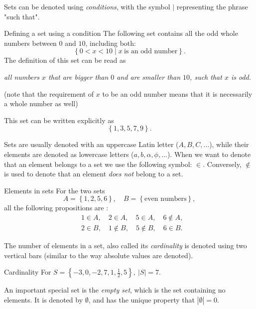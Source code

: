 Sets can be denoted using \emph{conditions}, with the symbol $|$ representing the phrase "such that".

\begin{example}{Defining a set using a condition}
	The following set contains all the odd whole numbers between $0$ and $10$, including both:
	\[
		\left\{ 0 < x < 10 \mid x\ \text{is an odd number}\right\}.
	\]
	The definition of this set can be read as

	\vspace{3mm}
	\centering
	\textit{all numbers $x$ that are bigger than $0$ and are smaller than $10$, such that $x$ is odd.}

	\flushleft{}
	(note that the requirement of $x$ to be an odd number means that it is necessarily a whole number as well)

	\vspace{1em}
	This set can be written explicitly as
	\[
		\left\{ 1,3,5,7,9 \right\}.
	\]
\end{example}

Sets are usually denoted with an uppercase Latin letter ($A,B,C,\dots$), while their elements are denoted as lowercase letters ($a,b,\alpha,\phi,\dots$). When we want to denote that an element belongs to a set we use the following symbol: $\in$. Conversely, $\notin$ is used to denote that an element \textit{does not} belong to a set.
	
\begin{example}{Elements in sets}{}
	For the two sets
	\[
		A = \left\{ 1,2,5,6 \right\},\quad B=\left\{ \text{even numbers} \right\},
	\]
	all the following propositions are \true{}:
	\begin{align*}
		&1\in A,\quad 2\in A,\quad 5\in A,\quad 6\notin A,\\
		&2\in B,\quad 1\notin B,\quad 5\notin B,\quad 6\in B.
	\end{align*}
\end{example}

The number of elements in a set, also called its \emph{cardinality} is denoted using two vertical bars (similar to the way absolute values are denoted).

\begin{example}{Cardinality}{}
	For $S=\left\{ -3,0,-2,7,1,\frac{1}{2},5 \right\},\ |S|=7$.
\end{example}

An important special set is the \emph{empty set}, which is the set containing no elements. It is denoted by $\emptyset$, and has the unique property that $|\emptyset|=0$.

